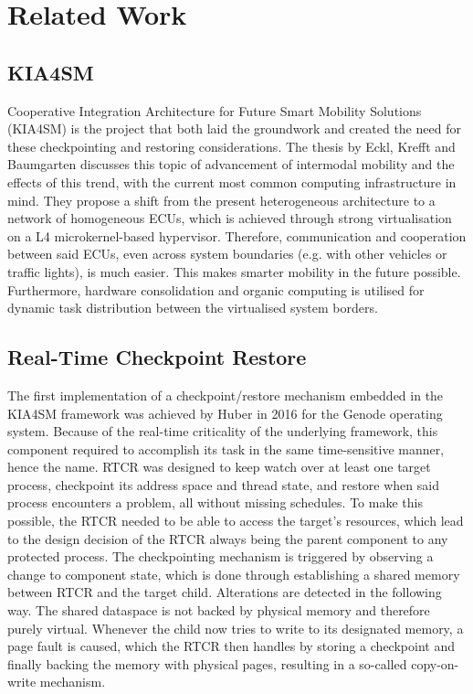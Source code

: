
\chapter{Related Work}\label{chapter:related_work}

\section{KIA4SM}
Cooperative Integration Architecture for Future Smart Mobility Solutions (KIA4SM) is the project that both laid the groundwork and created the need for these checkpointing and restoring considerations. The thesis by Eckl, Krefft and Baumgarten discusses this topic of advancement of intermodal mobility and the effects of this trend, with the current most common computing infrastructure in mind. They propose a shift from the present heterogeneous architecture to a network of homogeneous ECUs, which is achieved through strong virtualisation on a L4 microkernel-based hypervisor. Therefore, communication and cooperation between said ECUs, even across system boundaries (e.g. with other vehicles or traffic lights), is much easier. This makes smarter mobility in the future possible. Furthermore, hardware consolidation and organic computing is utilised for dynamic task distribution between the virtualised system borders. \cite{kia4sm}

\section{Real-Time Checkpoint Restore}
The first implementation of a checkpoint/restore mechanism embedded in the KIA4SM framework was achieved by Huber in 2016 for the Genode operating system. Because of the real-time criticality of the underlying framework, this component required to accomplish its task in the same time-sensitive manner, hence the name. RTCR was designed to keep watch over at least one target process, checkpoint its address space and thread state, and restore when said process encounters a problem, all without missing schedules. To make this possible, the RTCR needed to be able to access the target's resources, which lead to the design decision of the RTCR always being the parent component to any protected process. The checkpointing mechanism is triggered by observing a change to component state, which is done through establishing a shared memory between RTCR and the target child. Alterations are detected in the following way. The shared dataspace is not backed by physical memory and therefore purely virtual. Whenever the child now tries to write to its designated memory, a page fault is caused, which the RTCR then handles by storing a checkpoint and finally backing the memory with physical pages, resulting in a so-called copy-on-write mechanism.

